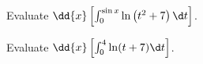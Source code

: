 \documentclass{ximera}
\author{Nela Lakos \and Kyle Parsons}
\begin{document}
\begin{exercise}

Evaluate $\dd{x}\left[\int_0^{\sin x} \ln\left(t^2+7\right) \d t\right]$.
\begin{multipleChoice}
\end{multipleChoice}

Evaluate $\dd{x}\left[\int_0^4 \ln(t+7) \d t\right]$.
\begin{multipleChoice}
\end{multipleChoice}

\end{exercise}
\end{document}
